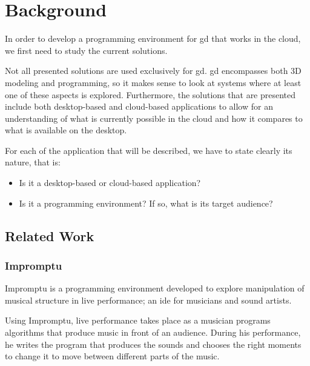 
\chapter{Background}
\label{chapter:background}
In order to develop a programming environment for \gls{gd} that works in the cloud, we first need to study the current solutions.

Not all presented solutions are used exclusively for \gls{gd}.
\gls{gd} encompasses both 3D modeling and programming, so it makes sense to look at systems where at least one of these aspects is explored.
Furthermore, the solutions that are presented include both desktop-based and cloud-based applications to allow for an understanding of what is currently possible in the cloud and how it compares to what is available on the desktop.

For each of the application that will be described, we have to state clearly its nature, that is:
\begin{itemize}
	\item Is it a desktop-based or cloud-based application?
	\item Is it a programming environment? If so, what is its target audience?
\end{itemize}


\section{Related Work}


\subsection{Impromptu}
\label{section:impromptu:related}
Impromptu\cite{sorensen2005impromptu,sorensen2010programming} is a programming environment developed to explore manipulation of musical structure in live performance; an \gls{ide} for musicians and sound artists.

Using Impromptu, live performance takes place as a musician programs algorithms that produce music in front of an audience.
During his performance, he writes the program that produces the sounds and chooses the right moments to change it to move between different parts of the music.

